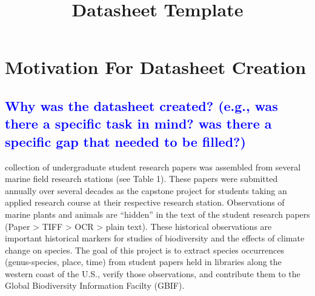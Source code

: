 \documentclass[letterpaper, 10 pt, conference]{ieeeconf}  %
\title{\LARGE \bf
Datasheet Template
}
\begin{document}
\maketitle
\thispagestyle{empty}
\pagestyle{empty}

\section{Motivation For Datasheet Creation}

\textcolor{blue}{\subsection{Why was the datasheet created? (e.g., was there a specific task in mind? was there a specific gap that needed to
be filled?)}}

\A collection of undergraduate student research papers was assembled from several marine field research stations (see Table 1). These papers were submitted annually over several decades as the capstone project for students taking an applied research course at their respective research station. Observations of marine plants and animals are “hidden” in the text of the student research papers (Paper > TIFF > OCR > plain text). These historical observations are important historical markers for studies of biodiversity and the effects of climate change on species. The goal of this project is to extract species occurrences (genus-species, place, time) from student papers held in libraries along the western coast of the U.S., verify those observations, and contribute them to the Global Biodiversity Information Facilty (GBIF).
\end{document}
